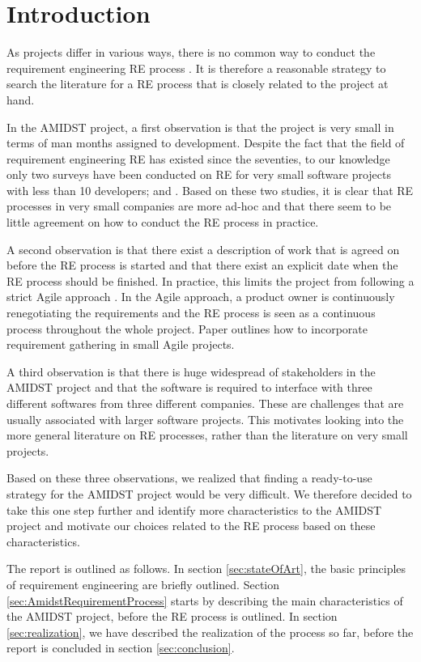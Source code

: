 \section{Introduction}

As projects differ in various ways, there is no common way to conduct the requirement engineering RE process \cite{Poh10}.  It is therefore a reasonable strategy to search the literature for a RE process that is closely related to the project at hand.  

In the AMIDST project, a first observation is that the project is very small in terms of man months assigned to development.  Despite the fact that the field of requirement engineering RE has existed since the seventies, to our knowledge only two surveys have been conducted on RE for very small software projects with less than 10 developers; \cite{Qui10} and \cite{Ara07}.  Based on these two studies, it is clear that RE processes in very small companies are more ad-hoc and that there seem to be little agreement on how to conduct the RE process in practice.

A second observation is that there exist a description of work that is agreed on before the RE process is started and that there exist an explicit date when the RE process should be finished.  In practice, this limits the project from following a strict Agile approach \cite{Din10}.  In the Agile approach, a product owner is continuously renegotiating the requirements and the RE process is seen as a continuous process throughout the whole project.  Paper \cite{Kav11} outlines how to incorporate requirement gathering in small Agile projects.  

A third observation is that there is huge widespread of stakeholders in the AMIDST project and that the software is required to interface with three different softwares from three different companies.  These are challenges that are usually associated with larger software projects.  This motivates looking into the more general literature on RE processes, rather than the literature on very small projects. 

Based on these three observations, we realized that finding a ready-to-use strategy for the AMIDST project would be very difficult.  We therefore decided to take this one step further and identify more characteristics to the AMIDST project and motivate our choices related to the RE process based on these characteristics. 

The report is outlined as follows.  In section \ref{sec:stateOfArt}, the basic principles of requirement engineering are briefly outlined.  Section \ref{sec:AmidstRequirementProcess} starts by describing the main characteristics of the AMIDST project, before the RE process is outlined.  In section \ref{sec:realization}, we have described the realization of the process so far, before the report is concluded in section \ref{sec:conclusion}.
